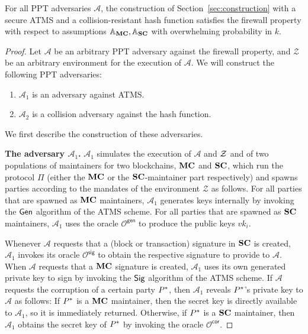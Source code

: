\begin{lemma}[Firewall]\label{lem:firewall}
  For all PPT adversaries $\mathcal{A}$, the construction of
  Section~\ref{sec:construction} with a secure ATMS and a collision-resistant
  hash function satisfies the firewall property with respect to assumptions
  $\mathbb{A}_{\mathbf{MC}}, \mathbb{A}_{\mathbf{SC}}$ with overwhelming probability in $k$.
\end{lemma}
\begin{proof}
  Let $\mathcal{A}$ be an arbitrary PPT adversary against the firewall property,
  and $\mathcal{Z}$ be
  an arbitrary environment for the execution of $\mathcal{A}$.
  We will construct the following PPT adversaries:
  \begin{enumerate}
    \item $\mathcal{A}_1$ is an adversary against ATMS.
    \item $\mathcal{A}_2$ is a collision adversary against the hash function.
  \end{enumerate}
  We first describe the construction of these adversaries.

  \bigskip
  \textbf{The adversary $\mathcal{A}_1$.}
  $\mathcal{A}_1$ simulates the execution of $\mathcal{A}$ and $\mathcal{Z}$ and
  of two populations of maintainers for two blockchains, $\mathbf{MC}$ and $\mathbf{SC}$,
  which run the protocol $\Pi$ (either the $\mathbf{MC}$ or the $\mathbf{SC}$-maintainer part
  respectively) and spawns parties according to the mandates of the environment
  $\mathcal{Z}$ as follows. For all parties that are spawned as $\mathbf{MC}$
  maintainers, $\mathcal{A}_1$ generates keys internally by invoking the $\mathsf{Gen}$
  algorithm of the ATMS scheme. For all parties that are spawned as $\mathbf{SC}$
  maintainers, $\mathcal{A}_1$ uses the oracle $\mathcal{O}^\textsf{gen}$
  to produce the public keys $vk_i$.

  Whenever $\mathcal{A}$ requests that a (block or transaction) signature in
  $\mathbf{SC}$  is created, $\mathcal{A}_1$ invokes its oracle
  $\mathcal{O}^\textsf{sig}$ to obtain the respective signature to provide to
  $\mathcal{A}$. When $\mathcal{A}$ requests that a $\mathbf{MC}$ signature is created,
  $\mathcal{A}_1$ uses its own generated private key to sign by invoking the
  $\mathsf{Sig}$ algorithm of the ATMS scheme. If $\mathcal{A}$ requests the corruption
  of a certain party $P^*$, then $\mathcal{A}_1$ reveals $P^*$'s
  private key to $\mathcal{A}$ as follows: If $P^*$ is a $\mathbf{MC}$ maintainer,
  then the secret key is directly available to $\mathcal{A}_1$, so it is
  immediately returned. Otherwise, if $P^*$ is a $\mathbf{SC}$ maintainer, then
  $\mathcal{A}_1$ obtains the secret key of $P^*$ by invoking the oracle
  $\mathcal{O}^\textsf{cor}$.


\end{proof}
